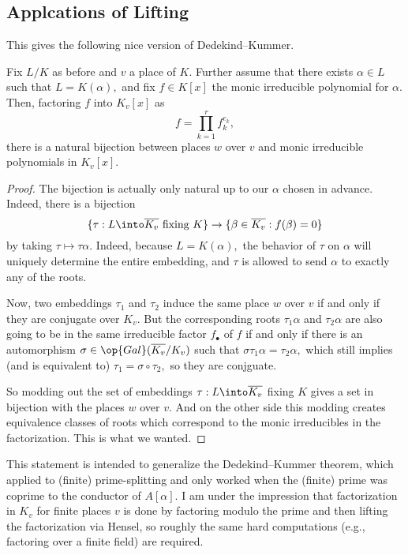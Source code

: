 \documentclass[../notes.tex]{subfiles}
\begin{document}
\subsection{Applcations of Lifting}
This gives the following nice version of Dedekind--Kummer.
\begin{proposition}
	Fix $L/K$ as before and $v$ a place of $K.$ Further assume that there exists $\alpha\in L$ such that $L=K(\alpha),$ and fix $f\in K[x]$ the monic irreducible polynomial for $\alpha.$ Then, factoring $f$ into $K_v[x]$ as
	\[f=\prod_{k=1}^rf_k^{e_k},\]
	there is a natural bijection between places $w$ over $v$ and monic irreducible polynomials in $K_v[x].$
\end{proposition}
\begin{proof}
	The bijection is actually only natural up to our $\alpha$ chosen in advance. Indeed, there is a bijection
	\[\{\tau:L\into\overline{K_v}\text{ fixing }K\}\to\{\beta\in\overline{K_v}:f(\beta)=0\}\]
	by taking $\tau\mapsto\tau\alpha.$ Indeed, because $L=K(\alpha),$ the behavior of $\tau$ on $\alpha$ will uniquely determine the entire embedding, and $\tau$ is allowed to send $\alpha$ to exactly any of the roots.

	Now, two embeddings $\tau_1$ and $\tau_2$ induce the same place $w$ over $v$ if and only if they are conjugate over $K_v.$ But the corresponding roots $\tau_1\alpha$ and $\tau_2\alpha$ are also going to be in the same irreducible factor $f_\bullet$ of $f$ if and only if there is an automorphism $\sigma\in\op{Gal}(\overline{K_v}/K_v)$ such that $\sigma\tau_1\alpha=\tau_2\alpha,$ which still implies (and is equivalent to) $\tau_1=\sigma\circ\tau_2,$ so they are conjguate.

	So modding out the set of embeddings $\tau:L\into\overline{K_v}$ fixing $K$ gives a set in bijection with the places $w$ over $v.$ And on the other side this modding creates equivalence classes of roots which correspond to the monic irreducibles in the factorization. This is what we wanted.
\end{proof}
\begin{remark}
	This statement is intended to generalize the Dedekind--Kummer theorem, which applied to (finite) prime-splitting and only worked when the (finite) prime was coprime to the conductor of $A[\alpha].$ I am under the impression that factorization in $K_v$ for finite places $v$ is done by factoring modulo the prime and then lifting the factorization via Hensel, so roughly the same hard computations (e.g., factoring over a finite field) are required.
\end{remark}
\end{document}
